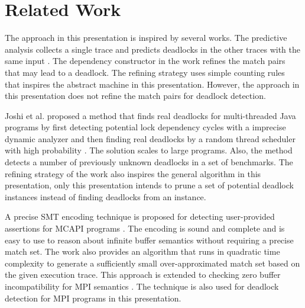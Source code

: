 \section{Related Work}
The approach in this presentation is inspired by several works. The predictive analysis collects a single trace and predicts deadlocks in the other traces with the same input  \cite{DBLP:conf/sc/SharmaGB12,Subodh:Dissertation}. The dependency constructor in the work refines the match pairs that may lead to a deadlock. The refining strategy uses simple counting rules that inspires the abstract machine in this presentation. However, the approach in this presentation does not refine the match pairs for deadlock detection.

Joshi et al. proposed a method that finds real deadlocks for multi-threaded Java programs by first detecting potential lock dependency cycles with a imprecise dynamic analyzer and then finding real deadlocks by a random thread scheduler with high probability \cite{DBLP:conf/pldi/JoshiPSN09}. The solution scales to large programs. Also, the method detects a number of previously unknown deadlocks in a set of benchmarks. The refining strategy of the work also inspires the general algorithm in this presentation, only this presentation intends to prune a set of potential deadlock instances instead of finding deadlocks from an instance.

A precise SMT encoding technique is proposed for detecting user-provided assertions for MCAPI programs \cite{DBLP:conf/kbse/HuangMM13}. The encoding is sound and complete and is easy to use to reason about infinite buffer semantics without requiring a precise match set. The work also provides an algorithm that runs in quadratic time complexity to generate a sufficiently small over-approximated match set based on the given execution trace. This approach is extended to checking zero buffer incompatibility for MPI semantics \cite{HuangNFM15}. 
The technique is also used for deadlock detection for MPI programs in this presentation.


